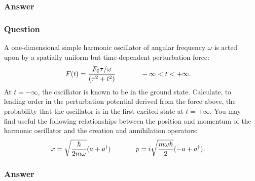 \subsubsection{Answer}



\subsubsection{Question}
A one-dimensional simple harmonic oscillator of angular frequency $\omega$ is acted upon by a spatially uniform but time-dependent perturbation force: $$F(t) = \frac{F_0\tau/\omega}{(\tau^2+t^2)}\hspace{.5in} -\infty<t<+\infty.$$ At $t=-\infty$, the oscillator is known to be in the ground state. Calculate, to leading order in the perturbation potential derived from the force above, the probability that the oscillator is in the first excited state at $t=+\infty$. You may find useful the following relationships between the position and momentum of the harmonic oscillator and the creation and annihilation operators: $$x=\sqrt{\frac{\hbar}{2m\omega}}(a+a^\dagger)\hspace{.5in}p = i\sqrt{\frac{m\omega\hbar}{2}}(-a+a^\dagger).$$
\subsubsection{Answer}


